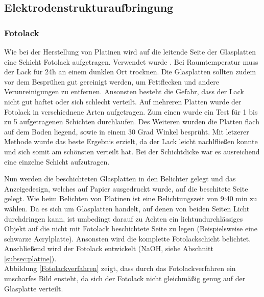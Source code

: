\subsection{Elektrodenstrukturaufbringung}


\subsubsection*{Fotolack}

Wie bei der Herstellung von Platinen wird auf die leitende Seite der Glasplatten eine Schicht Fotolack aufgetragen. Verwendet wurde \cite[\textit{POSITIV 20 Lichtemfpindlicher Lack}]{Fotolack}.
Bei Raumtemperatur muss der Lack für 24h an einem dunklen Ort trocknen. Die Glasplatten sollten zudem vor dem Besprühen gut gereinigt werden, um Fettflecken und andere Verunreinigungen zu entfernen. Ansonsten besteht die Gefahr, dass der Lack nicht gut haftet oder sich schlecht verteilt.
Auf mehreren Platten wurde der Fotolack in verschiednene Arten aufgetragen. Zum einen wurde ein Test für 1 bis zu 5 aufgetragenen Schichten durchlaufen. Des Weiteren wurden die Platten flach auf dem Boden liegend, sowie in einem 30 Grad Winkel besprüht.
Mit letzerer Methode wurde das beste Ergebnis erzielt, da der Lack leicht nachlfließen konnte und sich somit am schönsten verteilt hat. Bei der Schichtdicke war es ausreichend eine einzelne Schicht aufzutragen.

Nun werden die beschichteten Glasplatten in den Belichter gelegt und das Anzeigedesign, welches auf Papier ausgedruckt wurde, auf die beschitete Seite gelegt. Wie beim Belichten von Platinen ist eine Belichtungszeit von 9:40 min zu wählen. Da es sich um Glasplatten handelt, auf denen von beiden Seiten Licht durchdringen kann, ist umbedingt darauf zu Achten ein lichtundurchlässiges Objekt auf die nicht mit Fotolack beschichtete Seite zu legen (Beispielsweise eine schwarze Acrylplatte). Ansonsten wird die komplette Fotolackschicht belichtet. Anschließend wird der Fotolack entwickelt (NaOH, siehe Abschnitt \ref{subsec:platine}).\\

Abbildung \ref{Fotolackverfahren} zeigt, dass durch das Fotolackverfahren ein unscharfes Bild ensteht, da sich der Fotolack nicht gleichmäßig genug auf der Glasplatte verteilt.\\

